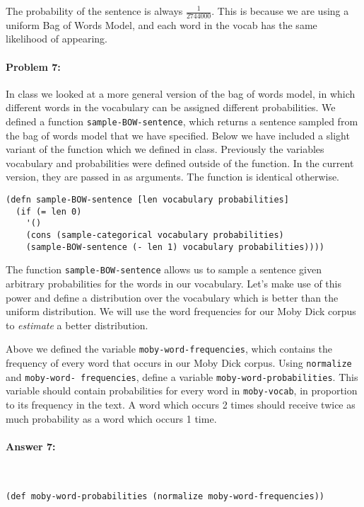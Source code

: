 \documentclass[12pt, letterpaper]{article}
\begin{document}
The probability of the sentence is always $\frac{1}{2744000}$. This is because we are using a uniform Bag of Words Model, and each word in the vocab has the same likelihood of appearing.

\hrulefill
\paragraph{Problem 7:}

In class we looked at a more general version of the bag of words
model, in which different words in the vocabulary can be assigned
different probabilities. We defined a function \texttt{sample-BOW-sentence},
which returns a sentence sampled from the bag of words model that we
have specified. Below we have included a slight variant of the
function which we defined in class. Previously the variables
vocabulary and probabilities were defined outside of the function. In
the current version, they are passed in as arguments. The function is
identical otherwise.

\begin{lstlisting}
(defn sample-BOW-sentence [len vocabulary probabilities]
  (if (= len 0)
    '()
    (cons (sample-categorical vocabulary probabilities)
    (sample-BOW-sentence (- len 1) vocabulary probabilities))))
\end{lstlisting}

The function \texttt{sample-BOW-sentence} allows us to sample a
sentence given arbitrary probabilities for the words in our
vocabulary. Let's make use of this power and define a distribution
over the vocabulary which is better than the uniform distribution. We
will use the word frequencies for our Moby Dick corpus to
\emph{estimate} a better distribution.
  
Above we defined the variable \texttt{moby-word-frequencies}, which
contains the frequency of every word that occurs in our Moby Dick
corpus. Using \texttt{normalize} and \texttt{moby-word- frequencies},
define a variable \texttt{moby-word-probabilities}. This variable
should contain probabilities for every word in \texttt{moby-vocab}, in
proportion to its frequency in the text. A word which occurs 2 times
should receive twice as much probability as a word which occurs 1
time.

\paragraph{Answer 7:}~\begin{lstlisting}
(def moby-word-probabilities (normalize moby-word-frequencies))
\end{lstlisting}
\end{document}
